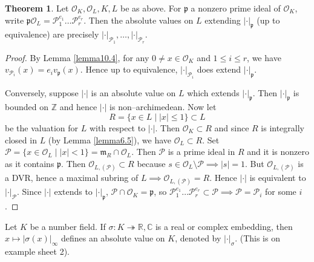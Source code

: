 \documentclass{article}
\theoremstyle{definition}
\newtheorem{theorem}{Theorem}[section]
\begin{document}
\begin{theorem}\label{theorem10.5}
    Let $\mathcal{O}_K, \mathcal{O}_L, K, L$ be as above. For $\mathfrak{p}$ a nonzero prime ideal of $\mathcal{O}_K$, write $\mathfrak{p}\mathcal{O}_L = \mathcal{P}_1^{e_1}\ldots \mathcal{P}_r^{e_r}$. Then the absolute values on $L$ extending $|\cdot|_{\mathfrak{p}}$ (up to equivalence) are precisely $|\cdot|_{\mathcal{P}_1},\ldots,|\cdot|_{\mathcal{P}_r}$.
\end{theorem}
\begin{proof}
    By Lemma \ref{lemma10.4}, for any $0 \neq x \in \mathcal{O}_K$ and $1\le i\le r$, we have $v_{\mathcal{P}_i}(x) = e_i v_{\mathfrak{p}}(x)$. Hence up to equivalence, $|\cdot|_{\mathcal{P}_i}$ does extend $|\cdot|_{\mathfrak{p}}$.
    \vspace{1mm}
     
    Conversely, suppose $|\cdot|$ is an absolute value on $L$ which extends $|\cdot|_{\mathfrak{p}}$. Then $|\cdot|_{\mathfrak{p}}$ is bounded on $\mathbb{Z}$ and hence $|\cdot|$ is non--archimedean. Now let $$R = \{ x \in L \mid |x|\le 1\} \subset L$$ be the valuation for $L$ with respect to $|\cdot|$. Then $\mathcal{O}_K \subset R$ and since $R$ is integrally closed in $L$ (by Lemma \ref{lemma6.5}), we have $\mathcal{O}_L \subset R$. Set $\mathcal{P} = \{ x \in \mathcal{O}_L \mid  |x|<1\} = \mathfrak{m}_R \cap \mathcal{O}_L$. Then $\mathcal{P}$ is a prime ideal in $R$ and it is nonzero as it contains $\mathfrak{p}$. Then $\mathcal{O}_{L,(\mathcal{P})} \subset R$ because $s \in \mathcal{O}_L\setminus \mathcal{P} \implies |s| = 1$. But $\mathcal{O}_{L,(\mathcal{P})}$ is a DVR, hence a maximal subring of $L \implies \mathcal{O}_{L,(\mathcal{P})} = R$. Hence $|\cdot|$ is equivalent to $|\cdot|_{\mathcal{P}}$. Since $|\cdot|$ extends to $|\cdot|_{\mathfrak{p}}$, $\mathcal{P} \cap \mathcal{O}_K = \mathfrak{p}$, so $\mathcal{P}_1^{e_1}\ldots \mathcal{P}_r^{e_r} \subset \mathcal{P} \implies \mathcal{P} = \mathcal{P}_i$ for some $i$.
\end{proof}
Let $K$ be a number field. If $\sigma : K \twoheadrightarrow \mathbb{R}, \mathbb{C}$ is a real or complex embedding, then $x \mapsto |\sigma(x)|_{\infty}$ defines an absolute value on $K$, denoted by $|\cdot|_{\sigma}$. (This is on example sheet 2).
\end{document}
